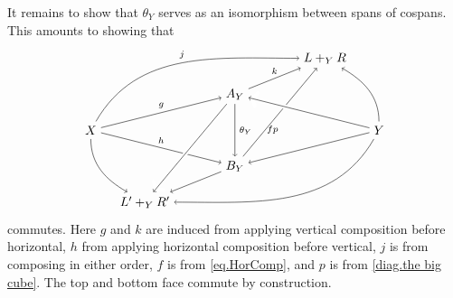 \documentclass[11pt]{amsart}
\theoremstyle{remark}
\theoremstyle{definition}
\begin{document}
It remains to show that $\theta_Y$ serves as 
an isomorphism between spans of cospans. This 
amounts to showing that
%
\begin{equation} 
\label{diag.theta 2-cell iso}
\begin{tikzpicture}[baseline=(current  bounding  box.center)]
	\node (X) at (-4,0) {$X$};
	\node (LyR) at (2.5,2) {$L+_YR$};
	\node (Y) at (4,0) {$Y$};
	\node (LyR') at (-2.5,-2) {$L'+_YR'$};
	\node (Ay) at (0,1) {$A_Y$};
	\node (By) at (0,-1) {$B_Y$};
	\draw [font=\scriptsize,->] (X) edge[in=180,out=60] node[above] {$j$} (LyR);
	\draw [font=\scriptsize,->] (X) edge node[above] {$g$} (Ay);
	\draw [font=\scriptsize,->] (X) edge node[above] {$h$} (By);
	\draw [->] (X) edge[out=-90,in=150] (LyR');
	\draw [->] (Y) edge[out=90,in=-30] (LyR);
	\draw [->] (Y) edge[] (By);
	\draw [->] (Y) edge[out=-120,in=0] (LyR');
	\draw [font=\scriptsize,->] (Ay) edge node[above] {$k$} (LyR);
	\draw [font=\scriptsize,->] (Ay) edge node[right] {$\theta_Y$} (By);
	\draw [font=\scriptsize,->] (By) edge[pos=0.4] node[below] {$fp$} (LyR);
	\draw [->] (By) edge[] (LyR');
	\draw [->] (Y) edge[white,line width=3.5pt] (Ay);
	\draw [->] (Y) edge[] (Ay);
	\draw [->] (Ay) edge[white,line width=3.5pt] (LyR');
	\draw [->] (Ay) edge[] (LyR');
\end{tikzpicture}
\end{equation}
%
commutes. Here $g$ and $k$ are induced from applying vertical composition before horizontal, $h$ from applying horizontal composition before vertical, $j$ is from composing in either order, $f$ is from \eqref{eq.HorComp}, and $p$ is from \eqref{diag.the big cube}.  The top and bottom face commute by construction.
%
%
%
%
%
%
\end{document}
